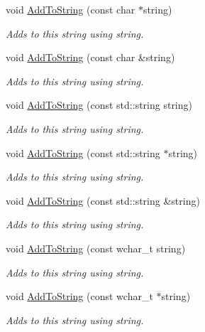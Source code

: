 \begin{DoxyCompactItemize}
void \hyperlink{class_triton_1_1_util_1_1_e_string_ae92adb32c6fe117a3aae034c2f485fee}{Add\+To\+String} (const char $\ast$string)
\begin{DoxyCompactList}\small\item\em Adds to this string using string. \end{DoxyCompactList}\item 
void \hyperlink{class_triton_1_1_util_1_1_e_string_abf7a207e75c7fcb123fd13252a0c6f59}{Add\+To\+String} (const char \&string)
\begin{DoxyCompactList}\small\item\em Adds to this string using string. \end{DoxyCompactList}\item 
void \hyperlink{class_triton_1_1_util_1_1_e_string_ad9ebb51ea590727a793ed04789f2ffbc}{Add\+To\+String} (const std\+::string string)
\begin{DoxyCompactList}\small\item\em Adds to this string using string. \end{DoxyCompactList}\item 
void \hyperlink{class_triton_1_1_util_1_1_e_string_a8c86482b41e5b70f16b1eca523dfc011}{Add\+To\+String} (const std\+::string $\ast$string)
\begin{DoxyCompactList}\small\item\em Adds to this string using string. \end{DoxyCompactList}\item 
void \hyperlink{class_triton_1_1_util_1_1_e_string_afcc86d9f98597d5cb23f9909046bfa0c}{Add\+To\+String} (const std\+::string \&string)
\begin{DoxyCompactList}\small\item\em Adds to this string using string. \end{DoxyCompactList}\item 
void \hyperlink{class_triton_1_1_util_1_1_e_string_a628824a69ed90a6be4ab138d13fdba2b}{Add\+To\+String} (const wchar\+\_\+t string)
\begin{DoxyCompactList}\small\item\em Adds to this string using string. \end{DoxyCompactList}\item 
void \hyperlink{class_triton_1_1_util_1_1_e_string_a01cbb0f1504c7bdf662cb0fbbae9da74}{Add\+To\+String} (const wchar\+\_\+t $\ast$string)
\begin{DoxyCompactList}\small\item\em Adds to this string using string. \end{DoxyCompactList}\item 

\end{DoxyCompactItemize}
